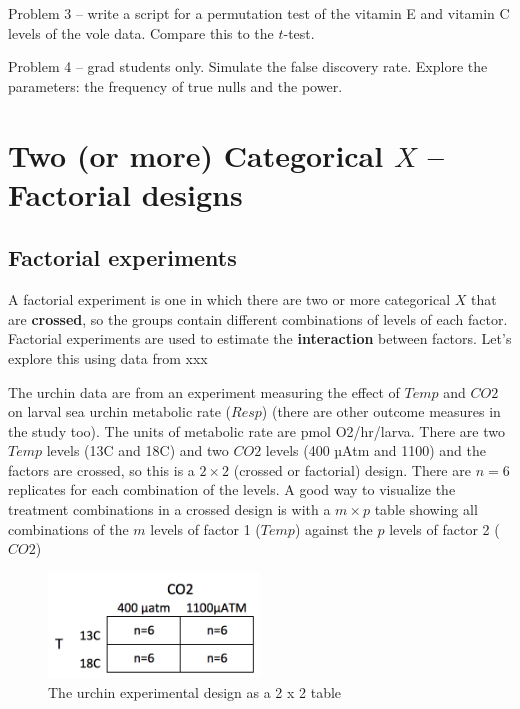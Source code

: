 \documentclass[]{book}
\theoremstyle{definition}
\theoremstyle{definition}
\theoremstyle{definition}
\theoremstyle{remark}
\begin{document}
Problem 3 -- write a script for a permutation test of the vitamin E and
vitamin C levels of the vole data. Compare this to the \(t\)-test.

Problem 4 -- grad students only. Simulate the false discovery rate.
Explore the parameters: the frequency of true nulls and the power.

\chapter{\texorpdfstring{Two (or more) Categorical \(X\) -- Factorial
designs}{Two (or more) Categorical X -- Factorial designs}}\label{two-or-more-categorical-x-factorial-designs}

\section{Factorial experiments}\label{factorial-experiments}

A factorial experiment is one in which there are two or more categorical
\(X\) that are \textbf{crossed}, so the groups contain different
combinations of levels of each factor. Factorial experiments are used to
estimate the \textbf{interaction} between factors. Let's explore this
using data from xxx

The urchin data are from an experiment measuring the effect of \(Temp\)
and \(CO2\) on larval sea urchin metabolic rate (\(Resp\)) (there are
other outcome measures in the study too). The units of metabolic rate
are pmol O2/hr/larva. There are two \(Temp\) levels (13C and 18C) and
two \(CO2\) levels (400 µAtm and 1100) and the factors are crossed, so
this is a \(2 \times 2\) (crossed or factorial) design. There are
\(n=6\) replicates for each combination of the levels. A good way to
visualize the treatment combinations in a crossed design is with a
\(m \times p\) table showing all combinations of the \(m\) levels of
factor 1 (\(Temp\)) against the \(p\) levels of factor 2 (\(CO2\))

\begin{figure}
\centering
\includegraphics[width=0.50000\textwidth]{images/2x2_table.png}
\caption{The urchin experimental design as a 2 x 2 table}
\end{figure}
\end{document}
